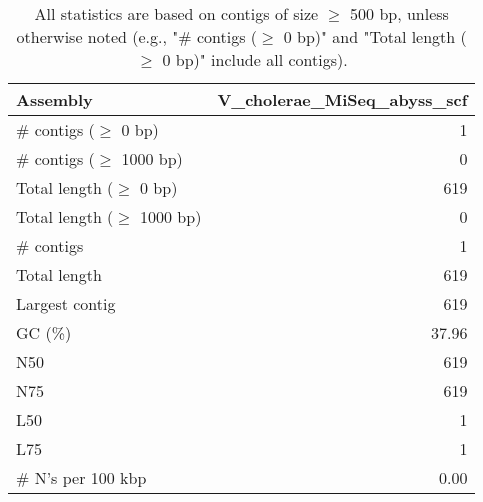 \documentclass[12pt,a4paper]{article}
\begin{document}
\begin{table}[ht]
\begin{center}
\caption{All statistics are based on contigs of size $\geq$ 500 bp, unless otherwise noted (e.g., "\# contigs ($\geq$ 0 bp)" and "Total length ($\geq$ 0 bp)" include all contigs).}
\begin{tabular}{|l*{1}{|r}|}
\hline
Assembly & V\_cholerae\_MiSeq\_abyss\_scf \\ \hline
\# contigs ($\geq$ 0 bp) & 1 \\ \hline
\# contigs ($\geq$ 1000 bp) & 0 \\ \hline
Total length ($\geq$ 0 bp) & 619 \\ \hline
Total length ($\geq$ 1000 bp) & 0 \\ \hline
\# contigs & 1 \\ \hline
Total length & 619 \\ \hline
Largest contig & 619 \\ \hline
GC (\%) & 37.96 \\ \hline
N50 & 619 \\ \hline
N75 & 619 \\ \hline
L50 & 1 \\ \hline
L75 & 1 \\ \hline
\# N's per 100 kbp & 0.00 \\ \hline
\end{tabular}
\end{center}
\end{table}
\end{document}
